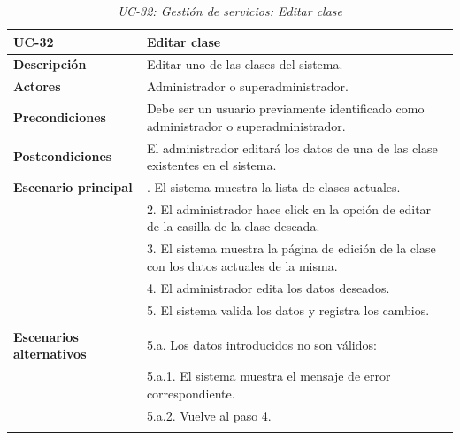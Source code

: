 \begin{table}
  \begin{center}
    \begin{tabularx}{16.4cm}{|l|X|}
      \hline
      \textbf{UC-32} & \textbf{Editar clase}\\
      \hline
      \textbf{Descripción} & Editar uno de las clases del sistema.\\
      \hline
      \textbf{Actores} & Administrador o superadministrador.\\
      \hline
      \textbf{Precondiciones} & Debe ser un usuario previamente identificado como administrador o superadministrador.\\
      \hline
      \textbf{Postcondiciones} & El administrador editará los datos de una de las clase existentes en el sistema.\\
      \hline
      \textbf{Escenario principal} & \smallskip 1. El sistema muestra la lista de clases actuales.\\
      & 2. El administrador hace click en la opción de editar de la casilla de la clase deseada.\\
      & 3. El sistema muestra la página de edición de la clase con los datos actuales de la misma.\\
      & 4. El administrador edita los datos deseados.\\
      & 5. El sistema valida los datos y registra los cambios.\\
      & \\
      \hline
      \textbf{Escenarios alternativos} & \smallskip 5.a. Los datos introducidos no son válidos:\\
      & \hspace{0.3cm} 5.a.1. El sistema muestra el mensaje de error correspondiente.\\
      & \hspace{0.3cm} 5.a.2. Vuelve al paso 4.\\
      & \\
      \hline
    \end{tabularx}
    \caption{\textit{UC-32: Gestión de servicios: Editar clase}}
    \label{tab:CU-editar-clase}
  \end{center}
\end{table}



